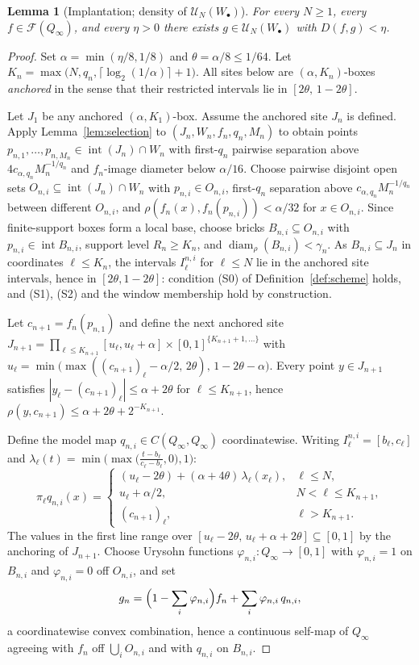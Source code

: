 \documentclass[11pt]{article}
\newtheorem{lemma}[theorem]{Lemma}
\newcommand{\Q}{Q_\infty}
\newcommand{\F}{\mathcal{F}}
\newcommand{\diam}{\operatorname{diam}}
\begin{document}
\begin{lemma}[Implantation; density of $\mathcal U_N(W_\bullet)$]\label{lem:density}
For every $N\ge1$, every $f\in\F(\Q)$, and every $\eta>0$ there exists
$g\in\mathcal U_N(W_\bullet)$ with $D(f,g)<\eta$.
\end{lemma}

\begin{proof}
Set $\alpha=\min(\eta/8,1/8)$ and $\theta=\alpha/8\le1/64$.  Let
$K_n=\max\bigl(N,q_n,\lceil\log_2(1/\alpha)\rceil+1\bigr)$.  All sites below are
$(\alpha,K_n)$-boxes \emph{anchored} in the sense that their restricted intervals lie
in $[2\theta,\,1-2\theta]$.

Let $J_1$ be any anchored $(\alpha,K_1)$-box.  Assume the anchored site $J_n$ is
defined.  Apply Lemma~\ref{lem:selection} to $(J_n,W_n,f_n,q_n,M_n)$ to obtain points
$p_{n,1},\dots,p_{n,M_n}\in\operatorname{int}(J_n)\cap W_n$ with first-$q_n$ pairwise
separation above $4c_{\alpha,q_n}M_n^{-1/q_n}$ and $f_n$-image diameter below
$\alpha/16$.  Choose pairwise disjoint open sets
$O_{n,i}\subseteq\operatorname{int}(J_n)\cap W_n$ with $p_{n,i}\in O_{n,i}$, first-$q_n$
separation above $c_{\alpha,q_n}M_n^{-1/q_n}$ between different $O_{n,i}$, and
$\rho(f_n(x),f_n(p_{n,i}))<\alpha/32$ for $x\in O_{n,i}$.  Since finite-support boxes
form a local base, choose bricks
$B_{n,i}\subseteq O_{n,i}$ with $p_{n,i}\in\operatorname{int}B_{n,i}$, support level
$R_n\ge K_n$, and $\diam_\rho(B_{n,i})<\gamma_n$.  As
$B_{n,i}\subseteq J_n$ in coordinates $\ell\le K_n$, the intervals $I^{n,i}_\ell$ for
$\ell\le N$ lie in the anchored site intervals, hence in $[2\theta,1-2\theta]$:
condition (S0) of Definition~\ref{def:scheme} holds, and (S1), (S2) and the window
membership hold by construction.

Let $c_{n+1}=f_n(p_{n,1})$ and define the next anchored site
$J_{n+1}=\prod_{\ell\le K_{n+1}}[u_\ell,u_\ell+\alpha]\times[0,1]^{\{K_{n+1}+1,\dots\}}$
with $u_\ell=\min\bigl(\max((c_{n+1})_\ell-\alpha/2,\,2\theta),\,1-2\theta-\alpha\bigr)$.
Every point $y\in J_{n+1}$ satisfies
$|y_\ell-(c_{n+1})_\ell|\le\alpha+2\theta$ for $\ell\le K_{n+1}$, hence
$\rho(y,c_{n+1})\le\alpha+2\theta+2^{-K_{n+1}}$.

Define the model map $q_{n,i}\in C(\Q,\Q)$ coordinatewise.  Writing
$I^{n,i}_\ell=[b_\ell,c_\ell]$ and
$\lambda_\ell(t)=\min\bigl(\max\bigl(\tfrac{t-b_\ell}{c_\ell-b_\ell},0\bigr),1\bigr)$:
\[
\pi_\ell q_{n,i}(x)=
\begin{cases}
(u_\ell-2\theta)+(\alpha+4\theta)\,\lambda_\ell(x_\ell), & \ell\le N,\\[2pt]
u_\ell+\alpha/2, & N<\ell\le K_{n+1},\\[2pt]
(c_{n+1})_\ell, & \ell>K_{n+1}.
\end{cases}
\]
The values in the first line range over $[u_\ell-2\theta,\,u_\ell+\alpha+2\theta]
\subseteq[0,1]$ by the anchoring of $J_{n+1}$.  Choose Urysohn functions
$\varphi_{n,i}:\Q\to[0,1]$ with $\varphi_{n,i}=1$ on $B_{n,i}$ and
$\varphi_{n,i}=0$ off $O_{n,i}$, and set
\[
g_n=\Bigl(1-\sum_i\varphi_{n,i}\Bigr)f_n+\sum_i\varphi_{n,i}\,q_{n,i},
\]
a coordinatewise convex combination, hence a continuous self-map of $\Q$ agreeing with
$f_n$ off $\bigcup_iO_{n,i}$ and with $q_{n,i}$ on $B_{n,i}$.


\end{proof}
\end{document}
